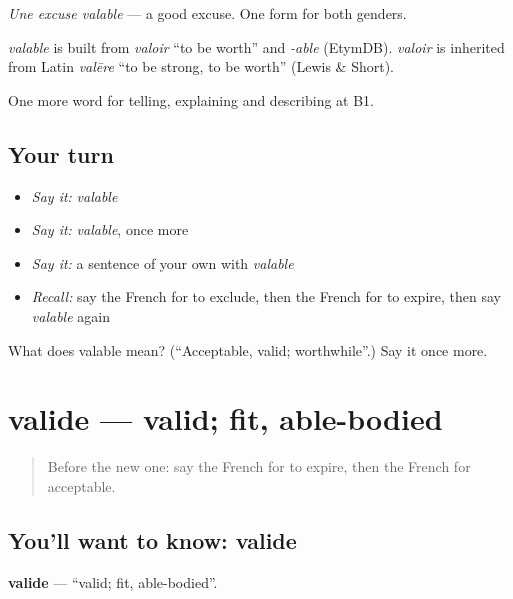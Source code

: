 \emph{Une excuse valable} — a good excuse. One form for both genders.

\begin{cousinweb}
\emph{valable} is built from \emph{valoir} \textquotedblleft{}to be worth\textquotedblright{} and \emph{-able} (EtymDB). \emph{valoir} is inherited from Latin \emph{valēre} \textquotedblleft{}to be strong, to be worth\textquotedblright{} (Lewis \& Short).
\end{cousinweb}

\begin{grammarlens}[title={What you've built}]
One more word for telling, explaining and describing at B1.
\end{grammarlens}

\subsection*{Your turn}
\begin{itemize}
\raggedright
  \item \emph{Say it:} \emph{valable}
  \item \emph{Say it:} \emph{valable}, once more
  \item \emph{Say it:} a sentence of your own with \emph{valable}
  \item \emph{Recall:} say the French for to exclude, then the French for to expire, then say \emph{valable} again
\end{itemize}

\begin{tcolorbox}[breakable,colback=teal!4,colframe=teal!35!black,title={Before you move on}]
What does valable mean? (\textquotedblleft{}Acceptable, valid; worthwhile\textquotedblright{}.) Say it once more.
\end{tcolorbox}
\section[valide]{valide — valid; fit, able-bodied}

\label{lesson:FR-C384-valide}



\begin{quote}
Before the new one: say the French for to expire, then the French for acceptable.
\end{quote}

\subsection*{You'll want to know: valide}
\textbf{valide} — \textquotedblleft{}valid; fit, able-bodied\textquotedblright{}.

